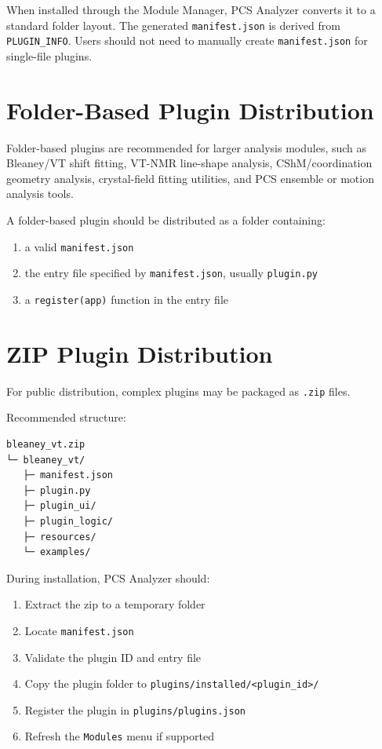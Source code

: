 \documentclass[11pt, a4paper]{article}
\begin{document}
When installed through the Module Manager, PCS Analyzer converts it to a standard folder layout. The generated \texttt{manifest.json} is derived from \texttt{PLUGIN\_INFO}. Users should not need to manually create \texttt{manifest.json} for single-file plugins.

\section{Folder-Based Plugin Distribution}

Folder-based plugins are recommended for larger analysis modules, such as Bleaney/VT shift fitting, VT-NMR line-shape analysis, CShM/coordination geometry analysis, crystal-field fitting utilities, and PCS ensemble or motion analysis tools.

A folder-based plugin should be distributed as a folder containing:

\begin{enumerate}
  \item a valid \texttt{manifest.json}
  \item the entry file specified by \texttt{manifest.json}, usually \texttt{plugin.py}
  \item a \texttt{register(app)} function in the entry file
\end{enumerate}

\section{ZIP Plugin Distribution}

For public distribution, complex plugins may be packaged as \texttt{.zip} files.

Recommended structure:

\begin{lstlisting}[style=text]
bleaney_vt.zip
└─ bleaney_vt/
   ├─ manifest.json
   ├─ plugin.py
   ├─ plugin_ui/
   ├─ plugin_logic/
   ├─ resources/
   └─ examples/
\end{lstlisting}

During installation, PCS Analyzer should:

\begin{enumerate}
  \item Extract the zip to a temporary folder
  \item Locate \texttt{manifest.json}
  \item Validate the plugin ID and entry file
  \item Copy the plugin folder to \texttt{plugins/installed/<plugin\_id>/}
  \item Register the plugin in \texttt{plugins/plugins.json}
  \item Refresh the \texttt{Modules} menu if supported
\end{enumerate}
\end{document}
